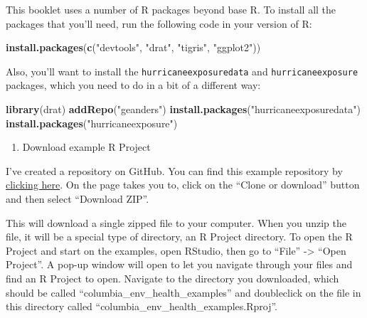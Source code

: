 \documentclass[]{tufte-book}
\newenvironment{Shaded}{}{}
\newcommand{\KeywordTok}[1]{\textcolor[rgb]{0.00,0.44,0.13}{\textbf{#1}}}
\newcommand{\NormalTok}[1]{#1}
\newcommand{\StringTok}[1]{\textcolor[rgb]{0.25,0.44,0.63}{#1}}
\providecommand{\tightlist}{%
  \setlength{\itemsep}{0pt}\setlength{\parskip}{0pt}}
\begin{document}
This booklet uses a number of R packages beyond base R. To install all the packages that you'll
need, run the following code in your version of R:

\begin{Shaded}
\begin{Highlighting}[]
\KeywordTok{install.packages}\NormalTok{(}\KeywordTok{c}\NormalTok{(}\StringTok{"devtools"}\NormalTok{, }\StringTok{"drat"}\NormalTok{, }\StringTok{"tigris"}\NormalTok{, }
    \StringTok{"ggplot2"}\NormalTok{))}
\end{Highlighting}
\end{Shaded}

Also, you'll want to install the \texttt{hurricaneexposuredata} and \texttt{hurricaneexposure} packages, which
you need to do in a bit of a different way:

\begin{Shaded}
\begin{Highlighting}[]
\KeywordTok{library}\NormalTok{(drat)}
\KeywordTok{addRepo}\NormalTok{(}\StringTok{"geanders"}\NormalTok{)}
\KeywordTok{install.packages}\NormalTok{(}\StringTok{"hurricaneexposuredata"}\NormalTok{)}
\KeywordTok{install.packages}\NormalTok{(}\StringTok{"hurricaneexposure"}\NormalTok{)}
\end{Highlighting}
\end{Shaded}

\begin{enumerate}
\def\labelenumi{\arabic{enumi}.}
\setcounter{enumi}{3}
\tightlist
\item
  Download example R Project
\end{enumerate}

I've created a repository on GitHub. You can find this example
repository by \href{https://github.com/geanders/columbia_env_health_examples}{clicking here}. On the
page takes you to, click on the ``Clone or download'' button and then select ``Download ZIP''.

This will download a single zipped file to your computer. When you unzip the file, it will be a
special type of directory, an R Project directory. To open the R Project and start on the
examples, open RStudio, then go to ``File'' -\textgreater{} ``Open Project''. A pop-up window will open to let you
navigate through your files and find an R Project to open. Navigate to the directory you
downloaded, which should be called ``columbia\_env\_health\_examples'' and doubleclick on the file
in this directory called ``columbia\_env\_health\_examples.Rproj''.
\end{document}
